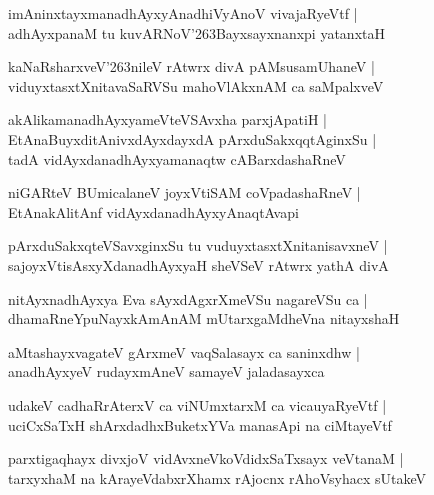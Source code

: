 \documentclass[twoside,12pt,openright]{book}
\def\S{\char'263}
\newcounter{shloka}[chapter]
\begin{document}
\begin{shloka}
imAninxtayxmanadhAyxyAnadhiVyAnoV vivajaRyeVtf |\\
adhAyxpanaM tu kuvARNoV\S Bayxsayxnanxpi yatanxtaH
\end{shloka}

\begin{shloka}
kaNaRsharxveV\S nileV rAtwrx divA pAMsusamUhaneV |\\
viduyxtasxtXnitavaSaRVSu mahoVlAkxnAM ca saMpalxveV 
\end{shloka}

\begin{shloka}
akAlikamanadhAyxyameVteVSAvxha parxjApatiH |\\
EtAnaBuyxditAnivxdAyxdayxdA pArxduSakxqqtAginxSu |\\
tadA vidAyxdanadhAyxyamanaqtw cABarxdashaRneV 
\end{shloka}

\begin{shloka}
niGARteV BUmicalaneV joyxVtiSAM coVpadashaRneV |\\
EtAnakAlitAnf vidAyxdanadhAyxyAnaqtAvapi 
\end{shloka}

\begin{shloka}
pArxduSakxqteVSavxginxSu tu vuduyxtasxtXnitanisavxneV |\\
sajoyxVtisAsxyXdanadhAyxyaH sheVSeV rAtwrx yathA divA
\end{shloka}

\begin{shloka}
nitAyxnadhAyxya Eva sAyxdAgxrXmeVSu nagareVSu ca |\\
dhamaRneYpuNayxkAmAnAM mUtarxgaMdheVna nitayxshaH
\end{shloka}

\begin{shloka}
aMtashayxvagateV gArxmeV vaqSalasayx ca saninxdhw |\\
anadhAyxyeV rudayxmAneV samayeV jaladasayxca
\end{shloka}

\begin{shloka}
udakeV cadhaRrAterxV ca viNUmxtarxM ca vicauyaRyeVtf |\\
uciCxSaTxH shArxdadhxBuketxYVa manasApi na ciMtayeVtf 
\end{shloka}

\begin{shloka}
parxtigaqhayx divxjoV vidAvxneVkoVdidxSaTxsayx veVtanaM |\\
tarxyxhaM na kArayeVdabxrXhamx rAjocnx rAhoVsyhacx sUtakeV
\end{shloka}
\end{document}

